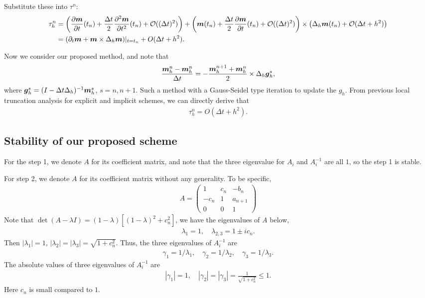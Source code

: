 \documentclass[preprint,times,3p]{elsarticle}
\def\g{\mbox{\boldmath $g$}}
\def\m{\mbox{\boldmath $m$}}
\begin{document}
Substitute these into $\tau^n$:
\begin{align*}
    \tau_h^n &= \left( \frac{\partial \boldsymbol{m}}{\partial t}(t_n) + \frac{\Delta t}{2} \frac{\partial^2 \boldsymbol{m}}{\partial t^2}(t_n) + \mathcal{O}((\Delta t)^2) \right) + \left( \boldsymbol{m}(t_n) + \frac{\Delta t}{2} \frac{\partial \boldsymbol{m}}{\partial t}(t_n) + \mathcal{O}((\Delta t)^2) \right) \times \left( \Delta_h \boldsymbol{m}(t_n) +  \mathcal{O}(\Delta t+h^2) \right)\\
    &=(\partial_t \m+\m\times \Delta_h\m)|_{t=t_n}+O(\Delta t+h^2).
\end{align*}

Now we consider our proposed method, and note that
\begin{align*}
    \frac{\m_h^n-\m_h^n}{\Delta t}=-\frac{\m_h^{n+1}+\m_h^n}{2}\times \Delta_h \g_h^s,
\end{align*}
where $\g_h^{s}=(I-\Delta t \Delta_h)^{-1}\m_h^{s}$, $s=n,n+1$. Such a method with a Gauss-Seidel type iteration to update the $g_h$. From previous local truncation analysis for explicit and implicit schemes, we can directly derive that
\begin{align*}
    \tau_h^n=O(\Delta t+h^2).
\end{align*}



\subsection{Stability of our proposed scheme}
For the step 1, we denote $A$ for its coefficient matrix, and note that the three eigenvalue for $A_i$ and $A_i^{-1}$ are all $1$, so the step 1 is stable.

For step 2, we denote $A$ for its coefficient matrix without any generality. To be specific,
\begin{align}
    A=\begin{pmatrix}
        1 & c_n&-b_{n}\\
        -c_n &1 &a_{n+1}\\
        0 &0&1
    \end{pmatrix}
\end{align}
Note that $\det(A-\lambda I)=(1-\lambda)[(1-\lambda)^2+c_n^2]$, we have the eigenvalues of $A$ below,
\begin{align*}
    \lambda_1=1,\quad \lambda_{2,3}=1\pm ic_n.
\end{align*}
Then $|\lambda_1|=1$, $|\lambda_2|=|\lambda_3|=\sqrt{1+c_n^2}$. Thus, the three eigenvalues of $A_i^{-1}$ are 
\begin{align*}
    \gamma_1=1/\lambda_1,\quad \gamma_2=1/\lambda_2,\quad \gamma_3=1/\lambda_3.
\end{align*}
The absolute values of three eigenvalues of $A_i^{-1}$ are 
\begin{align*}
    |\gamma_1|=1,\quad |\gamma_2|=|\gamma_3|=\frac{1}{\sqrt{1+c_n^2}}\le 1.
\end{align*}
Here $c_n$ is small compared to $1$.
\end{document}
